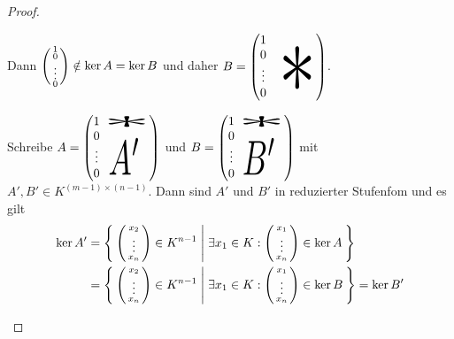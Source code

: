 \documentclass[../../main.tex]{subfiles}
\begin{document}
\begin{proof}
\begin{itemize}
\begin{enumerate}[{Fall }1:]
Dann $\left(\begin{smallmatrix}1\\0\\\vdots\\0\end{smallmatrix}\right)\notin \ker A=\ker B$ und daher
$B=\begin{pmatrix}1&&&&\\0&&&&\\
\vdots&&&
\begin{tikzpicture}[overlay]\node[xshift=-0.5em,yshift=1em,xscale=6,yscale=8]{$*$};\end{tikzpicture}&\\
0&&&&
\end{pmatrix}$.





Schreibe $A=\begin{pmatrix}1&&\begin{tikzpicture}[overlay]\node[xshift=0.2em,yshift=0.25em,xscale=8,yscale=2]{$*$};\end{tikzpicture}&&\\
0&&&&\\
\vdots&&
\begin{tikzpicture}[overlay]\node[yshift=0.5em,xscale=2.5,yscale=4]{$A'$};\end{tikzpicture}&&\\
0&&&&
\end{pmatrix}$ und
$B=\begin{pmatrix}1&&\begin{tikzpicture}[overlay]\node[xshift=0.2em,yshift=0.25em,xscale=8,yscale=2]{$*$};\end{tikzpicture}&&\\
0&&&&\\
\vdots&&
\begin{tikzpicture}[overlay]\node[yshift=0.5em,xscale=2.5,yscale=4]{$B'$};\end{tikzpicture}&&\\
0&&&&
\end{pmatrix}$ mit $A',B'\in K^{(m-1)\times (n-1)}$. Dann sind $A'$ und $B'$ in reduzierter Stufenfom und es gilt
\begin{align*}
\ker A' &= \Set{\cvec{x_2\\\vdots\\x_n}\in K^{n-1} | \exists x_1\in K:\cvec{x_1\\\vdots\\x_n}\in \ker  A}\\
&=\Set{\cvec{x_2\\\vdots\\x_n}\in K^{n-1} | \exists x_1\in K:\cvec{x_1\\\vdots\\x_n}\in \ker B} = \ker B'

\end{align*}
\end{enumerate}
\end{itemize}
\end{proof}
\end{document}
